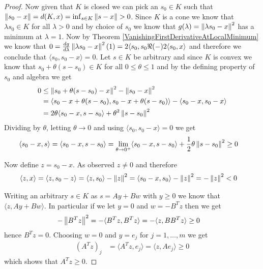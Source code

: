 \begin{proof}
Now given that $K$ is closed we can pick an $s_0 \in K$ such that $\left \lVert s_0 - x \right \rVert = d(K, x) = \inf_{s \in K} \left \lVert s - x \right \rVert> 0$.  
Since $K$ is a cone we know that $\lambda s_0 \in K$ for all $\lambda > 0$ and by choice of $s_0$ we know that 
$g(\lambda) = \left \lVert \lambda s_0 - x \right \rVert^2$ has a minimum at $\lambda = 1$.  Now by Theorem \ref{VanishingFirstDerivativeAtLocalMinimum}
we know that $0 = \frac{dg}{d\lambda} \left \lVert \lambda s_0 - x \right \rVert^2(1) = 2 \langle s_0,  s_0 \Re(-) 2 \langle s_0, x \rangle$ and therefore
we conclude that $\langle s_0, s_0 - x \rangle = 0$.  Let $s \in K$ be arbitrary and since $K$ is convex we know that $s_0 + \theta (s - s_0) \in K$ for
all $0 \leq \theta \leq 1$ and by the defining property of $s_0$ and algebra we get
\begin{align*}
0 &\leq \left \lVert s_0 + \theta (s - s_0) -x  \right \rVert^2 - \left \lVert s_0 -x  \right \rVert^2  \\
&=\langle s_0 - x + \theta (s - s_0), s_0 - x + \theta (s - s_0) \rangle - \langle s_0 -x, s_0 -x \rangle \\
&=2 \theta \langle s_0 - x, s - s_0 \rangle + \theta^2 \left \lVert s - s_0 \right \rVert^2
\end{align*}
Dividing by $\theta$,  letting $\theta \to 0$ and using $\langle s_0, s_0 - x \rangle = 0$ we get 
\begin{align*}
\langle s_0 - x, s \rangle &= \langle s_0 - x, s - s_0 \rangle = \lim_{\theta \to 0^+}  \langle s_0 - x, s - s_0 \rangle + \frac{1}{2}\theta \left \lVert s - s_0 \right \rVert^2 \geq 0
\end{align*}

Now define $z = s_0 - x$.  As observed $z \neq 0$ and therefore
\begin{align*}
\langle z, x \rangle &= \langle z, s_0 - z \rangle = \langle z, s_0 \rangle - \left \lVert z \right \rVert^2 = \langle s_0 - x, s_0 \rangle - \left \lVert z \right \rVert^2 = - \left \lVert z \right \rVert^2 < 0
\end{align*}

Writing an arbitrary $s \in K$ as $s = A y + B w$ with $y \geq 0$ we know that $\langle z, A y + B w \rangle$.  In particular if we let $y = 0$ and
$w = -B^T z$ then we get 
\begin{align*}
-\left \lVert B^T z \right \rVert^2 &= -\langle B^T z, B^T z \rangle= -\langle z, B B^T z \rangle \geq 0
\end{align*}
hence $B^T z = 0$.  Choosing $w=0$ and $y = e_j$ for $j=1, \dotsc, m$ we get
\begin{align*}
(A^Tz)_j &= \langle A^T z, e_j \rangle = \langle z , A e_j \rangle \geq 0
\end{align*}
which shows that $A^T z \geq 0$.
\end{proof}

